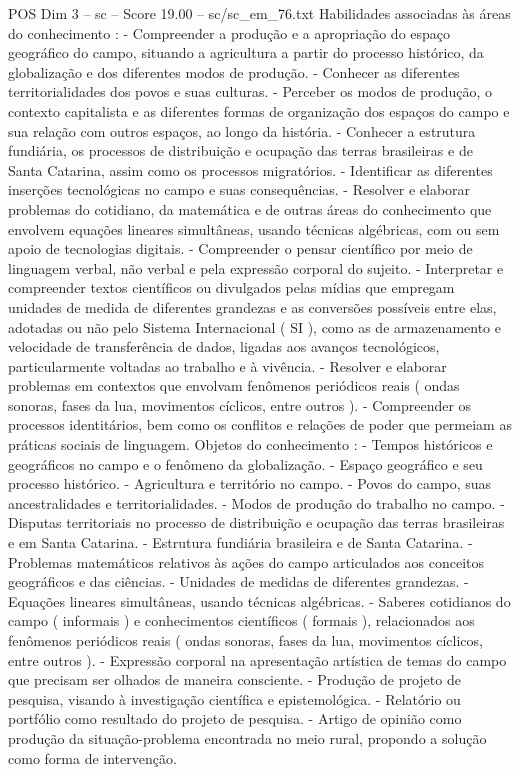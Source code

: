\begin{textsample}{POS Dim 3 – sc – Score 19.00 – sc/sc\_em\_76.txt}
Habilidades associadas às áreas do conhecimento : - Compreender a produção e a apropriação do espaço geográfico do campo, situando a agricultura a partir do processo histórico, da globalização e dos diferentes modos de produção. - Conhecer as diferentes territorialidades dos povos e suas culturas. - Perceber os modos de produção, o contexto capitalista e as diferentes formas de organização dos espaços do campo e sua relação com outros espaços, ao longo da história. - Conhecer a estrutura fundiária, os processos de distribuição e ocupação das terras brasileiras e de Santa Catarina, assim como os processos migratórios. - Identificar as diferentes inserções tecnológicas no campo e suas consequências. - Resolver e elaborar problemas do cotidiano, da matemática e de outras áreas do conhecimento que envolvem equações lineares simultâneas, usando técnicas algébricas, com ou sem apoio de tecnologias digitais. - Compreender o pensar científico por meio de linguagem verbal, não verbal e pela expressão corporal do sujeito. - Interpretar e compreender textos científicos ou divulgados pelas mídias que empregam unidades de medida de diferentes grandezas e as conversões possíveis entre elas, adotadas ou não pelo Sistema Internacional ( SI ), como as de armazenamento e velocidade de transferência de dados, ligadas aos avanços tecnológicos, particularmente voltadas ao trabalho e à vivência. - Resolver e elaborar problemas em contextos que envolvam fenômenos periódicos reais ( ondas sonoras, fases da lua, movimentos cíclicos, entre outros ). - Compreender os processos identitários, bem como os conflitos e relações de poder que permeiam as práticas sociais de linguagem.
Objetos do conhecimento : - Tempos históricos e geográficos no campo e o fenômeno da globalização. - Espaço geográfico e seu processo histórico. - Agricultura e território no campo. - Povos do campo, suas ancestralidades e territorialidades. - Modos de produção do trabalho no campo. - Disputas territoriais no processo de distribuição e ocupação das terras brasileiras e em Santa Catarina. - Estrutura fundiária brasileira e de Santa Catarina. - Problemas matemáticos relativos às ações do campo articulados aos conceitos geográficos e das ciências. - Unidades de medidas de diferentes grandezas. - Equações lineares simultâneas, usando técnicas algébricas. - Saberes cotidianos do campo ( informais ) e conhecimentos científicos ( formais ), relacionados aos fenômenos periódicos reais ( ondas sonoras, fases da lua, movimentos cíclicos, entre outros ). - Expressão corporal na apresentação artística de temas do campo que precisam ser olhados de maneira consciente. - Produção de projeto de pesquisa, visando à investigação científica e epistemológica. - Relatório ou portfólio como resultado do projeto de pesquisa. - Artigo de opinião como produção da situação-problema encontrada no meio rural, propondo a solução como forma de intervenção.

\end{textsample}
